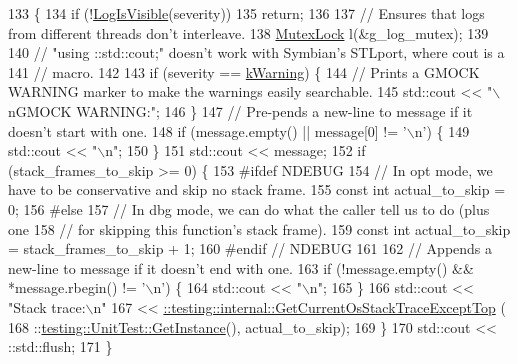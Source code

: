 \begin{DoxyCode}
133                                               \{
134   \textcolor{keywordflow}{if} (!\hyperlink{namespacetesting_1_1internal_a69ffdba5ee36743e88d8f89b79e566ff}{LogIsVisible}(severity))
135     \textcolor{keywordflow}{return};
136 
137   \textcolor{comment}{// Ensures that logs from different threads don't interleave.}
138   \hyperlink{namespacetesting_1_1internal_a08b187c6cc4e28400aadf9a32fccc8de}{MutexLock} l(&g\_log\_mutex);
139 
140   \textcolor{comment}{// "using ::std::cout;" doesn't work with Symbian's STLport, where cout is a}
141   \textcolor{comment}{// macro.}
142 
143   \textcolor{keywordflow}{if} (severity == \hyperlink{namespacetesting_1_1internal_a203d1a8a2147a53d12bbdae40d443914a5beeeab1b0a3caabd0afb43356c1a271}{kWarning}) \{
144     \textcolor{comment}{// Prints a GMOCK WARNING marker to make the warnings easily searchable.}
145     std::cout << \textcolor{stringliteral}{"\(\backslash\)nGMOCK WARNING:"};
146   \}
147   \textcolor{comment}{// Pre-pends a new-line to message if it doesn't start with one.}
148   \textcolor{keywordflow}{if} (message.empty() || message[0] != \textcolor{charliteral}{'\(\backslash\)n'}) \{
149     std::cout << \textcolor{stringliteral}{"\(\backslash\)n"};
150   \}
151   std::cout << message;
152   \textcolor{keywordflow}{if} (stack\_frames\_to\_skip >= 0) \{
153 \textcolor{preprocessor}{#ifdef NDEBUG}
154     \textcolor{comment}{// In opt mode, we have to be conservative and skip no stack frame.}
155     \textcolor{keyword}{const} \textcolor{keywordtype}{int} actual\_to\_skip = 0;
156 \textcolor{preprocessor}{#else}
157     \textcolor{comment}{// In dbg mode, we can do what the caller tell us to do (plus one}
158     \textcolor{comment}{// for skipping this function's stack frame).}
159     \textcolor{keyword}{const} \textcolor{keywordtype}{int} actual\_to\_skip = stack\_frames\_to\_skip + 1;
160 \textcolor{preprocessor}{#endif  // NDEBUG}
161 
162     \textcolor{comment}{// Appends a new-line to message if it doesn't end with one.}
163     \textcolor{keywordflow}{if} (!message.empty() && *message.rbegin() != \textcolor{charliteral}{'\(\backslash\)n'}) \{
164       std::cout << \textcolor{stringliteral}{"\(\backslash\)n"};
165     \}
166     std::cout << \textcolor{stringliteral}{"Stack trace:\(\backslash\)n"}
167          << \hyperlink{namespacetesting_1_1internal_aeb475922b8cd1e6c60ac052bbc396e62}{::testing::internal::GetCurrentOsStackTraceExceptTop}
      (
168              ::\hyperlink{classtesting_1_1UnitTest_a24192400b70b3b946746954e9574fb8e}{testing::UnitTest::GetInstance}(), actual\_to\_skip);
169   \}
170   std::cout << ::std::flush;
171 \}
\end{DoxyCode}
